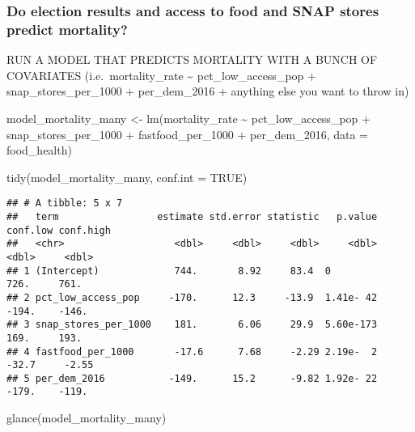\documentclass[
]{article}
\newenvironment{Shaded}{\begin{snugshade}}{\end{snugshade}}
\newcommand{\AttributeTok}[1]{\textcolor[rgb]{0.77,0.63,0.00}{#1}}
\newcommand{\ConstantTok}[1]{\textcolor[rgb]{0.00,0.00,0.00}{#1}}
\newcommand{\FunctionTok}[1]{\textcolor[rgb]{0.00,0.00,0.00}{#1}}
\newcommand{\NormalTok}[1]{#1}
\newcommand{\OtherTok}[1]{\textcolor[rgb]{0.56,0.35,0.01}{#1}}
\newcommand{\SpecialCharTok}[1]{\textcolor[rgb]{0.00,0.00,0.00}{#1}}
\begin{document}
\hypertarget{do-election-results-and-access-to-food-and-snap-stores-predict-mortality}{%
\subsubsection{Do election results and access to food and SNAP stores
predict
mortality?}\label{do-election-results-and-access-to-food-and-snap-stores-predict-mortality}}

RUN A MODEL THAT PREDICTS MORTALITY WITH A BUNCH OF COVARIATES
(i.e.~mortality\_rate \textasciitilde{} pct\_low\_access\_pop +
snap\_stores\_per\_1000 + per\_dem\_2016 + anything else you want to
throw in)

\begin{Shaded}
\begin{Highlighting}[]
\NormalTok{model\_mortality\_many }\OtherTok{\textless{}{-}} \FunctionTok{lm}\NormalTok{(mortality\_rate }\SpecialCharTok{\textasciitilde{}}\NormalTok{ pct\_low\_access\_pop }\SpecialCharTok{+}
\NormalTok{                                            snap\_stores\_per\_1000 }\SpecialCharTok{+}
\NormalTok{                                            fastfood\_per\_1000 }\SpecialCharTok{+}
\NormalTok{                                            per\_dem\_2016,}
                           \AttributeTok{data =}\NormalTok{ food\_health)}

\FunctionTok{tidy}\NormalTok{(model\_mortality\_many, }\AttributeTok{conf.int =} \ConstantTok{TRUE}\NormalTok{)}
\end{Highlighting}
\end{Shaded}

\begin{verbatim}
## # A tibble: 5 x 7
##   term                 estimate std.error statistic   p.value conf.low conf.high
##   <chr>                   <dbl>     <dbl>     <dbl>     <dbl>    <dbl>     <dbl>
## 1 (Intercept)             744.       8.92     83.4  0            726.     761.  
## 2 pct_low_access_pop     -170.      12.3     -13.9  1.41e- 42   -194.    -146.  
## 3 snap_stores_per_1000    181.       6.06     29.9  5.60e-173    169.     193.  
## 4 fastfood_per_1000       -17.6      7.68     -2.29 2.19e-  2    -32.7     -2.55
## 5 per_dem_2016           -149.      15.2      -9.82 1.92e- 22   -179.    -119.
\end{verbatim}

\begin{Shaded}
\begin{Highlighting}[]
\FunctionTok{glance}\NormalTok{(model\_mortality\_many)}
\end{Highlighting}
\end{Shaded}
\end{document}
